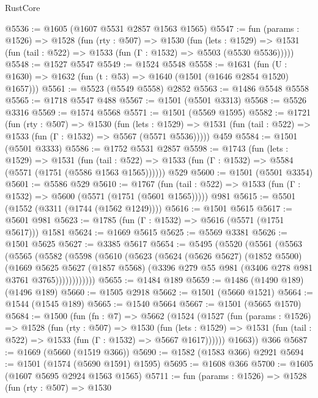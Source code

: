 \begin{lexlean}{RustCore}
\begin{coremodule}
@5536 := @1605 (@1607 @5531 @2857 @1563 @1565)
@5547 := fun (params : @1526) =>
  @1528
    (fun (rty : @507) =>
    @1530
      (fun (lets : @1529) =>
      @1531 (fun (tail : @522) => @1533 (fun (Γ : @1532) => @5503 (@5530 @5536)))))
@5548 := @1527 @5547
@5549 := @1524 @5548
@5558 := @1631 (fun (U : @1630) => @1632 (fun (t : @53) => @1640 (@1501 (@1646 @2854 @1520) @1657)))
@5561 := @5523 (@5549 @5558) @2852
@5563 := @1486 @5548 @5558
@5565 := @1718 @5547 @488
@5567 := @1501 (@5501 @3313)
@5568 := @5526 @3316
@5569 := @1574 @5568
@5571 := @1501 (@5569 @1595)
@5582 := @1721
    (fun (rty : @507) =>
    @1530
      (fun (lets : @1529) =>
      @1531 (fun (tail : @522) => @1533 (fun (Γ : @1532) => @5567 (@5571 @5536)))))
    @459
@5584 := @1501 (@5501 @3333)
@5586 := @1752 @5531 @2857
@5598 := @1743
    (fun (lets : @1529) =>
    @1531
      (fun (tail : @522) => @1533 (fun (Γ : @1532) => @5584 (@5571 (@1751 (@5586 @1563 @1565))))))
    @529
@5600 := @1501 (@5501 @3354)
@5601 := @5586 @529
@5610 := @1767
    (fun (tail : @522) => @1533 (fun (Γ : @1532) => @5600 (@5571 (@1751 (@5601 @1565)))))
    @981
@5615 := @5501 (@1552 (@3311 (@1744 (@1562 @1249))))
@5616 := @1501 @5615
@5617 := @5601 @981
@5623 := @1785 (fun (Γ : @1532) => @5616 (@5571 (@1751 @5617))) @1581
@5624 := @1669 @5615
@5625 := @5569 @3381
@5626 := @1501 @5625
@5627 := @3385 @5617
@5654 := @5495
    (@5520
      (@5561
        (@5563
          (@5565
            (@5582
              (@5598
                (@5610
                  (@5623
                    (@5624
                      (@5626 @5627)
                      (@1852 @5500)
                      (@1669
                        @5625
                        @5627
                        (@1857 @5568)
                        (@3396 @279 @55 @981 (@3406 @278 @981 @3761 @3765))))))))))))
@5655 := @1484 @189
@5659 := @1486 (@1490 @189) (@1496 @189)
@5660 := @1505 @2918
@5662 := @1501 (@5660 @1521)
@5664 := @1544 (@1545 @189)
@5665 := @1540 @5664
@5667 := @1501 (@5665 @1570)
@5684 := @1500
    (fun (fn : @7) =>
    @5662
      (@1524
        (@1527
          (fun (params : @1526) =>
          @1528
            (fun (rty : @507) =>
            @1530
              (fun (lets : @1529) =>
              @1531 (fun (tail : @522) => @1533 (fun (Γ : @1532) => @5667 @1617))))))
        @1663))
    @366
@5687 := @1669 (@5660 (@1519 @366))
@5690 := @1582 (@1583 @366) @2921
@5694 := @1501 (@1574 (@5690 @1591) @1595)
@5695 := @1608 @366
@5700 := @1605 (@1607 @5695 @2924 @1563 @1565)
@5711 := fun (params : @1526) =>
  @1528
    (fun (rty : @507) =>
    @1530

\end{coremodule}
\end{lexlean}
